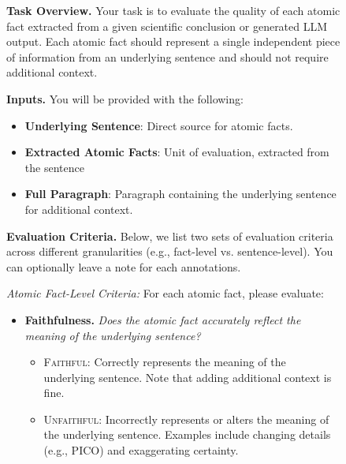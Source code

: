 \documentclass{article}
\begin{document}
\clearpage

\begin{figure}[h!]
\centering
\begin{small}
\begin{tcolorbox}[colback=gray!5, colframe=black, width=\textwidth, title=\textbf{Annotation Guideline for Evaluating Generated Atomic Facts}, fonttitle=\bfseries]
\textbf{Task Overview.}
Your task is to evaluate the quality of each atomic fact extracted from a given scientific conclusion or generated LLM output. Each atomic fact should represent a single independent piece of information from an underlying sentence and should not require additional context. 

\vspace{0.5em}
\textbf{Inputs.}
You will be provided with the following:

\begin{itemize}[leftmargin=0.6cm]
    \item \textbf{Underlying Sentence}: Direct source for atomic facts.
    \item \textbf{Extracted Atomic Facts}: Unit of evaluation, extracted from the sentence
    \item \textbf{Full Paragraph}: Paragraph containing the underlying sentence for additional context.
\end{itemize}

\vspace{0.5em}
\textbf{Evaluation Criteria.}
Below, we list two sets of evaluation criteria across different granularities (e.g., fact-level vs. sentence-level). You can optionally leave a note for each annotations.
\vspace{0.5em}

\textit{Atomic Fact-Level Criteria:}
For each atomic fact, please evaluate:
\begin{itemize}[leftmargin=0.6cm]
    \item\textbf{Faithfulness.} \textit{Does the atomic fact accurately reflect the meaning of the underlying sentence?}
    \vspace{-0.2em}
     \begin{itemize}[leftmargin=0.5cm]
        \item \textsc{Faithful}: Correctly represents the meaning of the underlying sentence. Note that adding additional context is fine.
        \item \textsc{Unfaithful}: Incorrectly represents or alters the meaning of the underlying sentence. Examples include changing details (e.g., PICO) and exaggerating certainty.
    \end{itemize}


\end{itemize}
\end{tcolorbox}
\end{small}
\end{figure}
\end{document}
